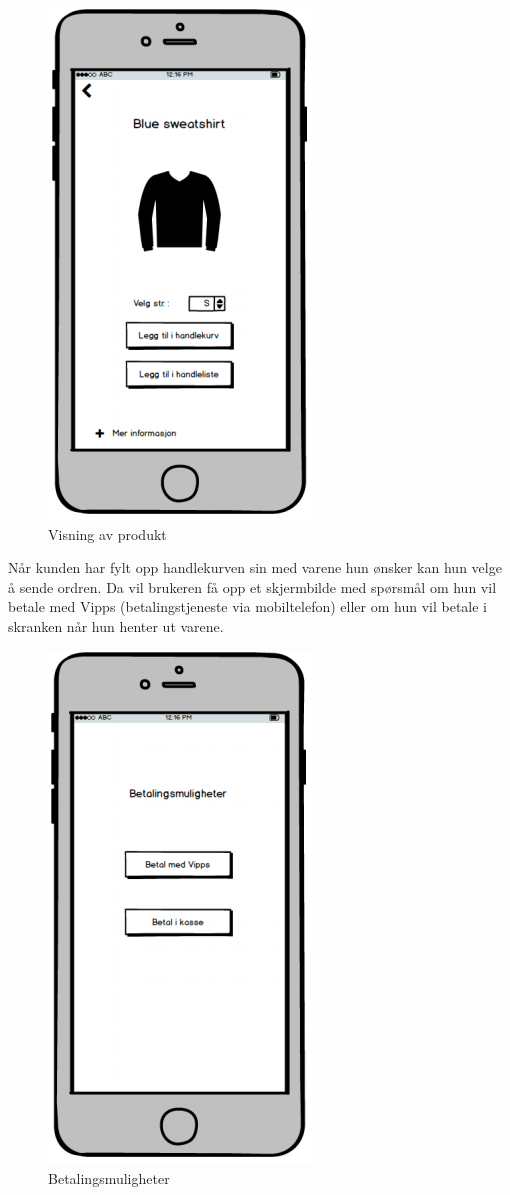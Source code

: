 \begin{figure}[H]
\includegraphics[scale=0.5]{images/prototype1/produkt}
\centering %
\caption{Visning av produkt}
\label{fig:produkt}
\end{figure}

\noindent Når kunden har fylt opp handlekurven sin med varene hun ønsker kan hun velge å sende ordren. Da vil brukeren få opp et skjermbilde med spørsmål om hun vil betale med Vipps (betalingstjeneste via mobiltelefon) eller om hun vil betale i skranken når hun henter ut varene.

\begin{figure}[H]
\includegraphics[scale=0.5]{images/prototype1/betalingsmuligheter}
\centering %
\caption{Betalingsmuligheter}
\label{fig:betalingsmuligheter}
\end{figure}

